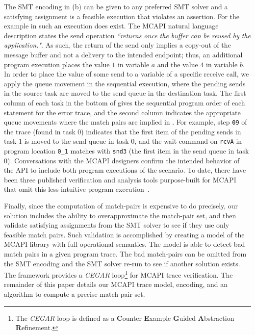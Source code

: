 The SMT encoding in (b) can be given to any preferred SMT
solver and a satisfying assignment is a feasible execution that violates an
assertion. For the example in  such an execution does exist.
The MCAPI natural language description states the send operation
\emph{``returns once the buffer can be reused by the application."}. As such,
the return of the send only implies a copy-out of the message buffer
and not a delivery to the intended endpoint; thus, an additional
program execution places the value $1$ in variable $a$ and the value
$4$ in variable $b$. In order to place the value of some send to a variable of a specific receive call, we apply the queue movement in the sequential execution, where the pending sends in the source task are moved to the send queue in the destination task. The first column of each task in the bottom
of  gives the sequential program order of each statement for the error trace, and the
second column indicates the appropriate queue movements where the match pairs are implied in . For example,
step \texttt{09} of the trace (found in task 0) indicates
that the first item of the pending sends in task 1 is moved to the send queue in task 0, and the wait command on \texttt{rcvA} in program location \texttt{0\_1} matches with \texttt{snd3} (the first item in the send queue in task 0).  Conversations with the
MCAPI designers confirm the intended behavior of the API to include
both program executions of the scenario. To date, there have been
three published verification and analysis tools purpose-built for
MCAPI that omit this less intuitive program
execution~\cite{sharma:fmcad09,elwakil:padtad10,elwakil:atva10}.

Finally, since the computation of match-pairs is expensive to do
precisely, our solution includes the ability to overapproximate the
match-pair set, and then validate satisfying assignments from the SMT
solver to see if they use only feasible match pairs. Such validation
is accomplished by creating a model of the MCAPI library with full
operational semantics. The model is able to detect bad match pairs in
a given program trace. The bad match-pairs can be omitted from the SMT
encoding and the SMT solver re-run to see if another solution exists.
The framework provides a \textit{CEGAR} loop\footnote{The \textit{CEGAR} loop is defined as a \textbf{C}ounter \textbf{E}xample \textbf{G}uided \textbf{A}bstraction \textbf{R}efinement.} for MCAPI trace verification. The
remainder of this paper details our MCAPI trace model, encoding, and
an algorithm to compute a precise match pair set.

